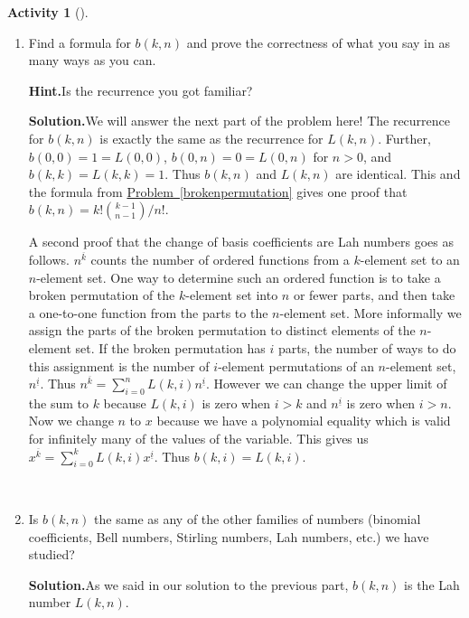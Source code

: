 \documentclass[10pt,]{book}
\theoremstyle{plain}
\theoremstyle{definition}
\newtheorem{activity}[project]{Activity}
\numberwithin{equation}{chapter}
\begin{document}
\begin{activity}[]
\begin{enumerate}[label=(\alph*)]
~\par
\item Find a formula for \(b(k,n)\) and prove the correctness of what you say in as many ways as you can.%
\par\medskip\noindent%
\textbf{Hint.}\quad Is the recurrence you got familiar?%
\par\medskip\noindent%
\textbf{Solution.}\quad We will answer the next part of the problem here! The recurrence for \(b(k,n)\) is exactly the same as the recurrence for \(L(k,n)\). Further, \(b(0,0)=1=L(0,0)\), \(b(0,n) = 0=L(0,n)\) for \(n>0\), and \(b(k,k)=L(k,k) =1\). Thus \(b(k,n)\) and \(L(k,n)\) are identical. This and the formula from \hyperref[brokenpermutation]{Problem~\ref{brokenpermutation}} gives one proof that \(b(k,n)=k!\binom{k-1}{n-1}/n!\).%
\par
A second proof that the change of basis coefficients are Lah numbers goes as follows. \(n^{\overline{k}}\) counts the number of ordered functions from a \(k\)-element set to an \(n\)-element set. One way to determine such an ordered function is to take a broken permutation of the \(k\)-element set into \(n\) or fewer parts, and then take a one-to-one function from the parts to the \(n\)-element set. More informally we assign the parts of the broken permutation to distinct elements of the \(n\)-element set. If the broken permutation has \(i\) parts, the number of ways to do this assignment is the number of \(i\)-element permutations of an \(n\)-element set, \(n^{\underline{i}}\). Thus \(n^{\overline{k}}=\sum_{i=0}^n L(k,i)n^{\underline{i}}\). However we can change the upper limit of the sum to \(k\) because \(L(k,i)\) is zero when \(i>k\) and \(n^{\underline{i}}\) is zero when \(i>n\). Now we change \(n\) to \(x\) because we have a polynomial equality which is valid for infinitely many of the values of the variable. This gives us \(x^{\overline{k}}=\sum_{i=0}^k L(k,i)x^{\underline{i}}\). Thus \(b(k,i) =
L(k,i)\).%

~\par
\item Is \(b(k,n)\) the same as any of the other families of numbers (binomial coefficients, Bell numbers, Stirling numbers, Lah numbers, etc.) we have studied?%
\par\medskip\noindent%
\textbf{Solution.}\quad As we said in our solution to the previous part, \(b(k,n)\) is the Lah number \(L(k,n)\).%


\end{enumerate}
\end{activity}
\end{document}
